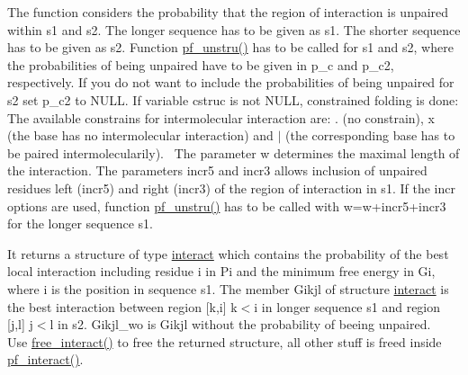 The function considers the probability that the region of interaction is unpaired within \textquotesingle{}s1\textquotesingle{} and \textquotesingle{}s2\textquotesingle{}. The longer sequence has to be given as \textquotesingle{}s1\textquotesingle{}. The shorter sequence has to be given as \textquotesingle{}s2\textquotesingle{}. Function \mbox{\hyperlink{group__up__cofold_ga5b4ee40e190d2f633cd01cf0d2fe93cf}{pf\+\_\+unstru()}} has to be called for \textquotesingle{}s1\textquotesingle{} and \textquotesingle{}s2\textquotesingle{}, where the probabilities of being unpaired have to be given in \textquotesingle{}p\+\_\+c\textquotesingle{} and \textquotesingle{}p\+\_\+c2\textquotesingle{}, respectively. If you do not want to include the probabilities of being unpaired for \textquotesingle{}s2\textquotesingle{} set \textquotesingle{}p\+\_\+c2\textquotesingle{} to N\+U\+LL. If variable \textquotesingle{}cstruc\textquotesingle{} is not N\+U\+LL, constrained folding is done\+: The available constrains for intermolecular interaction are\+: \textquotesingle{}.\textquotesingle{} (no constrain), \textquotesingle{}x\textquotesingle{} (the base has no intermolecular interaction) and \textquotesingle{}$\vert$\textquotesingle{} (the corresponding base has to be paired intermolecularily).~\newline
The parameter \textquotesingle{}w\textquotesingle{} determines the maximal length of the interaction. The parameters \textquotesingle{}incr5\textquotesingle{} and \textquotesingle{}incr3\textquotesingle{} allows inclusion of unpaired residues left (\textquotesingle{}incr5\textquotesingle{}) and right (\textquotesingle{}incr3\textquotesingle{}) of the region of interaction in \textquotesingle{}s1\textquotesingle{}. If the \textquotesingle{}incr\textquotesingle{} options are used, function \mbox{\hyperlink{group__up__cofold_ga5b4ee40e190d2f633cd01cf0d2fe93cf}{pf\+\_\+unstru()}} has to be called with w=w+incr5+incr3 for the longer sequence \textquotesingle{}s1\textquotesingle{}.

It returns a structure of type \mbox{\hyperlink{group__data__structures_structinteract}{interact}} which contains the probability of the best local interaction including residue i in Pi and the minimum free energy in Gi, where i is the position in sequence \textquotesingle{}s1\textquotesingle{}. The member Gikjl of structure \mbox{\hyperlink{group__data__structures_structinteract}{interact}} is the best interaction between region \mbox{[}k,i\mbox{]} k$<$i in longer sequence \textquotesingle{}s1\textquotesingle{} and region \mbox{[}j,l\mbox{]} j$<$l in \textquotesingle{}s2\textquotesingle{}. Gikjl\+\_\+wo is Gikjl without the probability of beeing unpaired.~\newline
Use \mbox{\hyperlink{group__up__cofold_gadde308fd5f696dc271b1532aa96fd12f}{free\+\_\+interact()}} to free the returned structure, all other stuff is freed inside \mbox{\hyperlink{group__up__cofold_ga1aa0aa02bc3a724f87360c03097afd00}{pf\+\_\+interact()}}.


